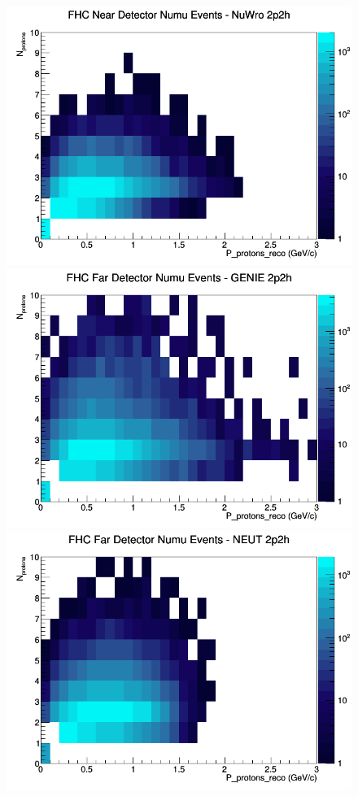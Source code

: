 \begin{figure}[h]
\includegraphics[width=\linewidth]{eff_N_P/GAr/protons/2p2h_FHC_ND_numu_N_P_NuWro.png}
\endminipage
\newline
{}
\includegraphics[width=\linewidth]{eff_N_P/GAr/protons/2p2h_FHC_FD_numu_N_P_GENIE.png}
\endminipage
{}
\includegraphics[width=\linewidth]{eff_N_P/GAr/protons/2p2h_FHC_FD_numu_N_P_NEUT.png}

\end{figure}

